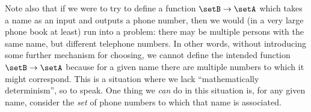 Note also that if we were to try to define a function $\setB \to \setA$ which takes a name as an input and outputs a phone number, then we would (in a very large phone book at least) run into a problem: there may be multiple persons with the same name, but different telephone numbers. In other words, without introducing some further mechanism for choosing, we cannot define the intended function $\setB \to \setA$ because for a given name there are multiple numbers to which it might correspond. This is a situation where we lack ``mathematically determinism'', so to speak. One thing we \emph{can} do in this situation is, for any given name, consider the \emph{set} of phone numbers to which that name is associated. 





\clearpage
